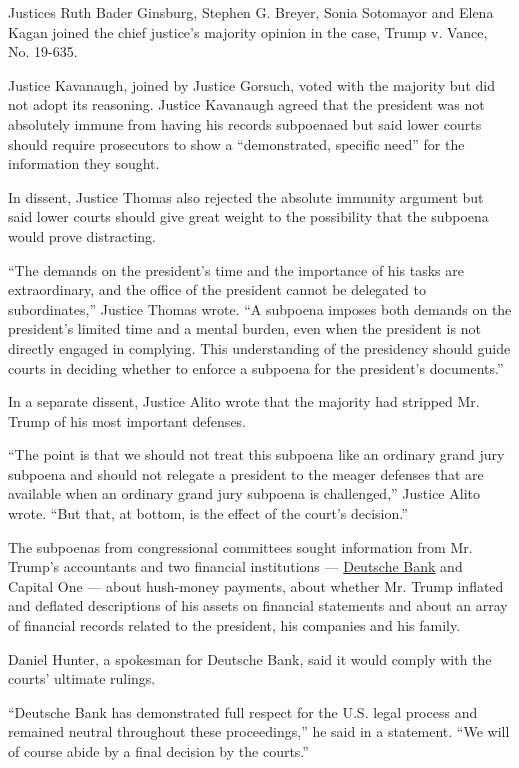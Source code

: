 Justices Ruth Bader Ginsburg, Stephen G. Breyer, Sonia Sotomayor and
Elena Kagan joined the chief justice's majority opinion in the case,
Trump v. Vance, No. 19-635.

Justice Kavanaugh, joined by Justice Gorsuch, voted with the majority
but did not adopt its reasoning. Justice Kavanaugh agreed that the
president was not absolutely immune from having his records subpoenaed
but said lower courts should require prosecutors to show a
``demonstrated, specific need'' for the information they sought.

In dissent, Justice Thomas also rejected the absolute immunity argument
but said lower courts should give great weight to the possibility that
the subpoena would prove distracting.

``The demands on the president's time and the importance of his tasks
are extraordinary, and the office of the president cannot be delegated
to subordinates,'' Justice Thomas wrote. ``A subpoena imposes both
demands on the president's limited time and a mental burden, even when
the president is not directly engaged in complying. This understanding
of the presidency should guide courts in deciding whether to enforce a
subpoena for the president's documents.''

In a separate dissent, Justice Alito wrote that the majority had
stripped Mr. Trump of his most important defenses.

``The point is that we should not treat this subpoena like an ordinary
grand jury subpoena and should not relegate a president to the meager
defenses that are available when an ordinary grand jury subpoena is
challenged,'' Justice Alito wrote. ``But that, at bottom, is the effect
of the court's decision.''

The subpoenas from congressional committees sought information from Mr.
Trump's accountants and two financial institutions ---
\href{https://www.nytimes.com/2020/02/04/magazine/deutsche-bank-trump.html}{Deutsche
Bank} and Capital One --- about hush-money payments, about whether Mr.
Trump inflated and deflated descriptions of his assets on financial
statements and about an array of financial records related to the
president, his companies and his family.

Daniel Hunter, a spokesman for Deutsche Bank, said it would comply with
the courts' ultimate rulings.

``Deutsche Bank has demonstrated full respect for the U.S. legal process
and remained neutral throughout these proceedings,'' he said in a
statement. ``We will of course abide by a final decision by the
courts.''

